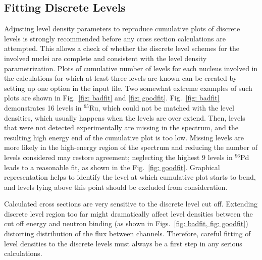 \documentclass[twocolumn,amsmath,amssymb,10pt,groupedaddress,letter]{revtex4}
\begin{document}
\subsection{Fitting Discrete Levels}
Adjusting level density parameters to reproduce cumulative plots of discrete levels is strongly recommended before any cross section calculations are attempted. This allows a check of whether the discrete level schemes for the involved nuclei are complete and consistent with the level density parametrization. Plots of cumulative number of levels for each nucleus involved in the calculations for which at least three levels are known can be created by setting up one option in the input file. Two somewhat extreme examples of such plots are shown in Fig.~\ref{fig: badfit} and \ref{fig: goodfit}. Fig.~\ref{fig: badfit} demonstrates 16 levels in $^{95}$Ru, which could not be matched with the level densities, which usually happens when the levels are over extend. Then, levels that were not detected experimentally are missing in the spectrum, and the resulting high energy end of the cumulative plot is too low. Missing levels are more likely in the high-energy region of the spectrum and reducing the number of levels considered may restore agreement; neglecting the highest 9 levels in $^{96}$Pd leads to a reasonable fit, as shown in the Fig.~\ref{fig: goodfit}. Graphical representation helps to identify the level at which cumulative plot starts to bend, and levels lying above this point should be excluded from consideration.

Calculated cross sections are very sensitive to the discrete level cut off. Extending discrete level region too far might dramatically affect level densities between the cut off energy and neutron binding (as shown in Figs.~\ref{fig: badfit, fig: goodfit}) distorting distribution of the flux between channels. Therefore, careful fitting of level densities to the discrete levels must always be a first step in any serious calculations.
\end{document}
